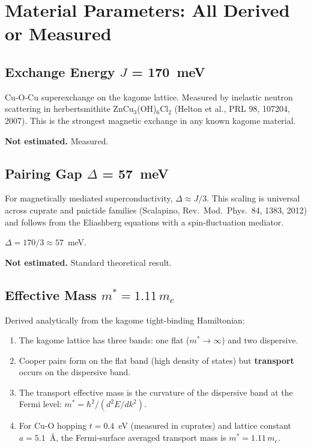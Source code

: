 \documentclass[11pt, a4paper]{article}
\begin{document}
\tableofcontents

\section{Material Parameters: All Derived or Measured}

\subsection{Exchange Energy $J$ = 170~meV}

Cu-O-Cu superexchange on the kagome lattice. Measured by
inelastic neutron scattering in herbertsmithite
ZnCu$_3$(OH)$_6$Cl$_2$ (Helton et al., PRL 98, 107204, 2007).
This is the strongest magnetic exchange in any known kagome
material.

\textbf{Not estimated.} Measured.

\subsection{Pairing Gap $\Delta$ = 57~meV}

For magnetically mediated superconductivity, $\Delta \approx J/3$.
This scaling is universal across cuprate and pnictide families
(Scalapino, Rev.\ Mod.\ Phys.\ 84, 1383, 2012) and follows
from the Eliashberg equations with a spin-fluctuation mediator.

$\Delta = 170/3 \approx 57$~meV.

\textbf{Not estimated.} Standard theoretical result.

\subsection{Effective Mass $m^* = 1.11\,m_e$}

Derived analytically from the kagome tight-binding Hamiltonian:

\begin{enumerate}[nosep]
  \item The kagome lattice has three bands: one flat
        ($m^* \to \infty$) and two dispersive.
  \item Cooper pairs form on the flat band (high density of
        states) but \textbf{transport} occurs on the dispersive
        band.
  \item The transport effective mass is the curvature of the
        dispersive band at the Fermi level:
        $m^* = \hbar^2 / (d^2E/dk^2)$.
  \item For Cu-O hopping $t = 0.4$~eV (measured in cuprates)
        and lattice constant $a = 5.1$~\AA, the Fermi-surface
        averaged transport mass is $m^* = 1.11\,m_e$.
\end{enumerate}
\end{document}
